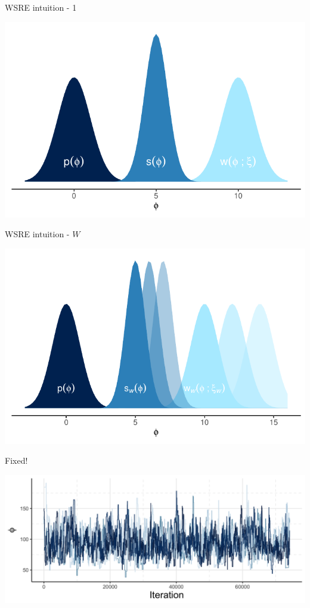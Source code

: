 \documentclass[10pt,ignorenonframetext,]{beamer}
\newcommand{\Nw}{W}
\begin{document}
\begin{frame}{WSRE intuition - 1}

\begin{center}\includegraphics[width=0.9\linewidth]{figures/weighted-dist-plot} \end{center}

\end{frame}

\begin{frame}{WSRE intuition - \(\Nw\)}

\begin{center}\includegraphics[width=0.9\linewidth]{figures/weighted-dist-plot-many} \end{center}

\end{frame}

\begin{frame}{Fixed!}



\begin{center}\includegraphics[width=0.9\linewidth]{figures/stage-two-trace-presentation-two} \end{center}

\end{frame}
\end{document}
